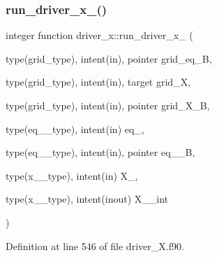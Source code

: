\subsubsection{\texorpdfstring{run\+\_\+driver\+\_\+x\+\_()}{run\_driver\_x\_2()}}
{\footnotesize\ttfamily integer function driver\+\_\+x\+::run\+\_\+driver\+\_\+x\+\_ (\begin{DoxyParamCaption}\item[{type(grid\+\_\+type), intent(in), pointer}]{grid\+\_\+eq\+\_\+B,  }\item[{type(grid\+\_\+type), intent(in), target}]{grid\+\_\+X,  }\item[{type(grid\+\_\+type), intent(in), pointer}]{grid\+\_\+\+X\+\_\+B,  }\item[{type(eq\+\_\+1\+\_\+type), intent(in)}]{eq\+\_,  }\item[{type(eq\+\_\+2\+\_\+type), intent(in), pointer}]{eq\+\_\+\_\+B,  }\item[{type(x\+\_\+1\+\_\+type), intent(in)}]{X\+\_,  }\item[{type(x\+\_\+2\+\_\+type), intent(inout)}]{X\+\_\+\_\+int }\end{DoxyParamCaption})}



Definition at line 546 of file driver\+\_\+\+X.\+f90.

